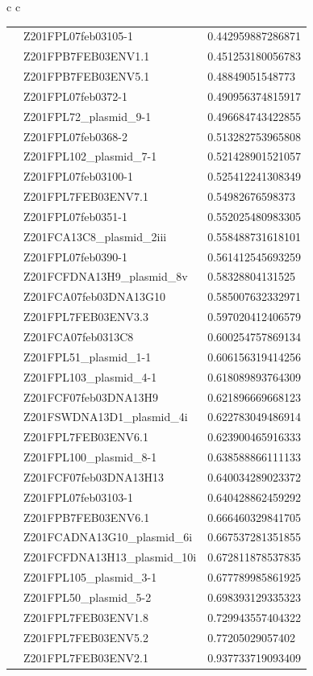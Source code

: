 \documentclass[conference]{IEEEtran}
\begin{document}
\begin{table}[]
\begin{tabular}{ c c}
\begin{tabular}{l l l}
&	Z201FPL07feb03105-1	&	0.442959887286871	\\
&	Z201FPB7FEB03ENV1.1	&	0.451253180056783	\\
&	Z201FPB7FEB03ENV5.1	&	0.48849051548773	\\
&	Z201FPL07feb0372-1	&	0.490956374815917	\\
&	Z201FPL72\_plasmid\_9-1	&	0.496684743422855	\\
&	Z201FPL07feb0368-2	&	0.513282753965808	\\
&	Z201FPL102\_plasmid\_7-1	&	0.521428901521057	\\
&	Z201FPL07feb03100-1	&	0.525412241308349	\\
&	Z201FPL7FEB03ENV7.1	&	0.54982676598373	\\
&	Z201FPL07feb0351-1	&	0.552025480983305	\\
&	Z201FCA13C8\_plasmid\_2iii	&	0.558488731618101	\\
&	Z201FPL07feb0390-1	&	0.561412545693259	\\
&	Z201FCFDNA13H9\_plasmid\_8v	&	0.58328804131525	\\
&	Z201FCA07feb03DNA13G10	&	0.585007632332971	\\
&	Z201FPL7FEB03ENV3.3	&	0.597020412406579	\\
&	Z201FCA07feb0313C8	&	0.600254757869134	\\
&	Z201FPL51\_plasmid\_1-1	&	0.606156319414256	\\
&	Z201FPL103\_plasmid\_4-1	&	0.618089893764309	\\
&	Z201FCF07feb03DNA13H9	&	0.621896669668123	\\
&	Z201FSWDNA13D1\_plasmid\_4i	&	0.622783049486914	\\
&	Z201FPL7FEB03ENV6.1	&	0.623900465916333	\\
&	Z201FPL100\_plasmid\_8-1	&	0.638588866111133	\\
&	Z201FCF07feb03DNA13H13	&	0.640034289023372	\\
&	Z201FPL07feb03103-1	&	0.640428862459292	\\
&	Z201FPB7FEB03ENV6.1	&	0.666460329841705	\\
&	Z201FCADNA13G10\_plasmid\_6i	&	0.667537281351855	\\
&	Z201FCFDNA13H13\_plasmid\_10i	&	0.672811878537835	\\
&	Z201FPL105\_plasmid\_3-1	&	0.677789985861925	\\
&	Z201FPL50\_plasmid\_5-2	&	0.698393129335323	\\
&	Z201FPL7FEB03ENV1.8	&	0.729943557404322	\\
&	Z201FPL7FEB03ENV5.2	&	0.77205029057402	\\
&	Z201FPL7FEB03ENV2.1	&	0.937733719093409	\\


\end{tabular}
\end{tabular}
\end{table}
\end{document}
